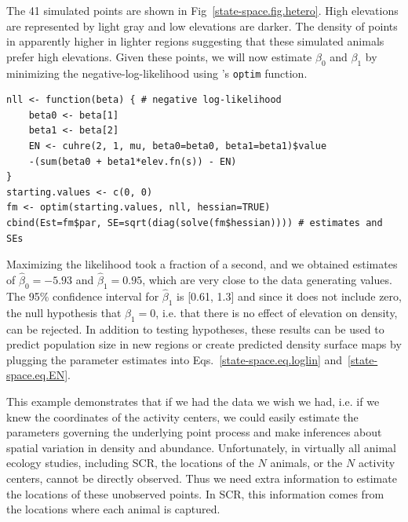 The 41 simulated points are shown in
Fig~\ref{state-space.fig.hetero}. High elevations
are represented by light gray and low elevations are darker. The
density of points in apparently higher in lighter regions
suggesting that these simulated animals prefer high
elevations.  %
Given these points, we will now estimate $\beta_0$ and $\beta_1$ by
minimizing the negative-log-likelihood using \R's \verb+optim+
function.

\begin{samepage}
\begin{small}
\begin{verbatim}
nll <- function(beta) { # negative log-likelihood
    beta0 <- beta[1]
    beta1 <- beta[2]
    EN <- cuhre(2, 1, mu, beta0=beta0, beta1=beta1)$value
    -(sum(beta0 + beta1*elev.fn(s)) - EN)
}
starting.values <- c(0, 0)
fm <- optim(starting.values, nll, hessian=TRUE)
cbind(Est=fm$par, SE=sqrt(diag(solve(fm$hessian)))) # estimates and SEs
\end{verbatim}
\end{small}
\end{samepage}
Maximizing the likelihood took a fraction of a second, and we
obtained estimates of $\hat{\beta}_0=-5.93$ and $\hat{\beta}_1=0.95$,
which are very close to the data generating values. The 95\% confidence
interval for $\hat{\beta}_1$ is [0.61, 1.3] and since it does not
include zero, the null hypothesis that $\beta_1=0$, i.e. that there is
no effect of elevation on density, can be rejected. In addition to testing
hypotheses, these results can be used to predict population size in
new regions or create predicted density surface maps by plugging the
parameter estimates into Eqs.~\ref{state-space.eq.loglin} and~\ref{state-space.eq.EN}.

This example demonstrates
that if we had the data we wish we had, i.e. if we knew the
coordinates of the activity centers, we could easily estimate the
parameters governing the underlying point process and make inferences
about spatial variation in density and abundance. Unfortunately, in
virtually all animal ecology studies, including
SCR, the locations of the $N$ animals, or the $N$ activity centers,
cannot be directly observed. Thus we need
extra information to estimate the locations of these unobserved
points. In SCR, this information comes from the locations where each
animal is captured.

